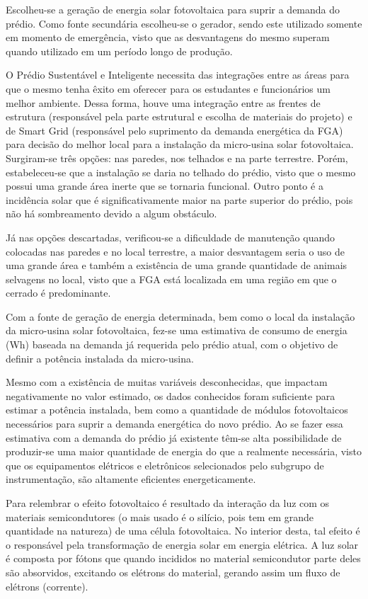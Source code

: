 Escolheu-se a geração de energia solar fotovoltaica para suprir a demanda do prédio. Como fonte secundária escolheu-se o gerador, sendo este utilizado somente em momento de emergência, visto que as desvantagens do mesmo superam quando utilizado em um período longo de produção.

O Prédio Sustentável e Inteligente necessita das integrações entre as áreas para que o mesmo tenha êxito em oferecer para os estudantes e funcionários um melhor ambiente. Dessa forma, houve uma integração entre as frentes de estrutura (responsável pela parte estrutural e escolha de materiais do projeto) e de Smart Grid (responsável pelo suprimento da demanda energética da FGA) para decisão do melhor local para a instalação da micro-usina solar fotovoltaica. Surgiram-se três opções: nas paredes, nos telhados e na parte terrestre. Porém, estabeleceu-se que a instalação se daria no telhado do prédio, visto que o mesmo possui uma grande área inerte que se tornaria funcional. Outro ponto é a incidência solar que é significativamente maior na parte superior do prédio, pois não há sombreamento devido a algum obstáculo.

Já nas opções descartadas, verificou-se a dificuldade de manutenção quando colocadas nas paredes e no local terrestre, a maior desvantagem seria o uso de uma grande área e também a existência  de uma grande quantidade de animais selvagens no local, visto que a FGA está localizada em uma região em que o cerrado é predominante.

Com a fonte de geração de energia determinada, bem como o local da instalação da micro-usina solar fotovoltaica, fez-se uma estimativa de consumo de energia (Wh) baseada na demanda já requerida pelo prédio atual, com o  objetivo de definir a potência instalada da micro-usina.

Mesmo com a existência de muitas variáveis desconhecidas, que impactam negativamente no valor estimado, os dados conhecidos foram suficiente para estimar a potência instalada, bem como a quantidade de módulos fotovoltaicos necessários para suprir a demanda energética do novo prédio. Ao se fazer essa estimativa com a demanda do prédio já existente têm-se  alta possibilidade de produzir-se uma maior quantidade de energia do que a realmente necessária, visto que os equipamentos elétricos e eletrônicos selecionados pelo subgrupo de instrumentação, são altamente eficientes energeticamente.

Para relembrar o efeito fotovoltaico é resultado da interação da luz com os materiais semicondutores (o mais usado é o silício, pois tem em grande quantidade na natureza) de uma célula fotovoltaica. No interior desta, tal efeito é o responsável pela transformação de energia solar em energia elétrica. A luz solar é composta por fótons que quando incididos no material semicondutor parte deles são absorvidos, excitando os elétrons do material, gerando assim um fluxo de elétrons (corrente). \cite{ideal}

